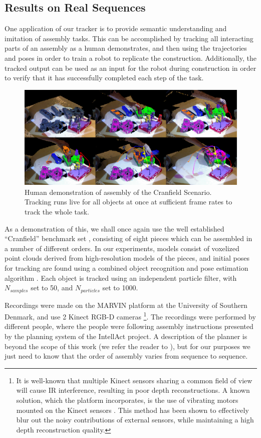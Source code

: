 \subsection{Results on Real Sequences}
One application of our tracker is to provide semantic understanding and imitation of assembly tasks. This can be accomplished by tracking all interacting parts of an assembly as a human demonstrates, and then using the trajectories and poses in order to train a robot to replicate the construction. Additionally, the tracked output can be used as an input for the robot during construction in order to verify that it has successfully completed each step of the task. 

\begin{figure}[!ht]
  \centering
  \includegraphics[width=1.0\textwidth]{figures/Tracking/HumanMontageSmall.pdf}
  \caption[Human demonstration of assembly of the Cranfield Scenario.]{Human demonstration of assembly of the Cranfield Scenario. Tracking runs live for all objects at once at sufficient frame rates to track the whole task.}
  \label{fig:Tracking_Montage}
\end{figure}

As a demonstration of this, we shall once again use the well established ``Cranfield'' benchmark set \cite{Collins1985}, consisting of eight pieces which can be assembled in a number of different orders. In our experiments, models consist of voxelized point clouds derived from high-resolution models of the pieces, and initial poses for tracking are found using a combined object recognition and pose estimation algorithm \cite{Buch_CVPR2014}. Each object is tracked using an independent particle filter, with $N_{samples}$ set to 50, and $N_{particles}$ set to 1000. 

Recordings were made on the MARVIN platform at the University of Southern Denmark, and use 2 Kinect RGB-D cameras \footnote{It is well-known that multiple Kinect sensors sharing a common field of view will cause IR interference, resulting in poor depth reconstructions. A known solution, which the platform incorporates, is the use of vibrating motors mounted on the Kinect sensors \cite{Butler2012}. This method has been shown to effectively blur out the noisy contributions of external sensors, while maintaining a high depth reconstruction quality.}. The recordings were performed by different people, where the people were following assembly instructions presented by the planning system of the IntellAct project. A description of the planner is beyond the scope of this work (we refer the reader to \cite{TODOPLANNER}), but for our purposes we just need to know that the order of assembly varies from sequence to sequence. 

